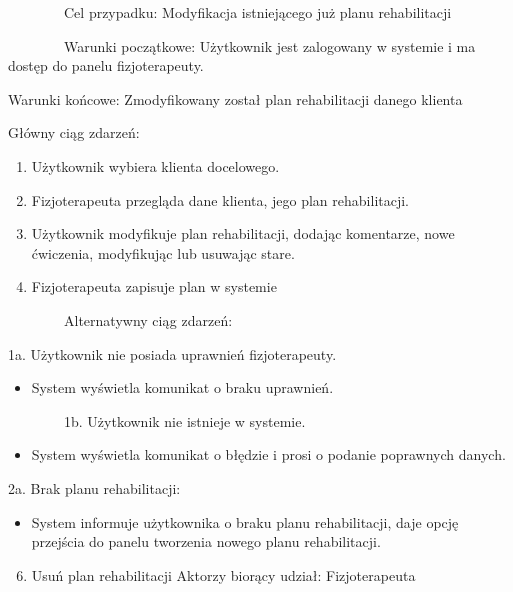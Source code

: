 \documentclass[
]{article}
\providecommand{\tightlist}{%
  \setlength{\itemsep}{0pt}\setlength{\parskip}{0pt}}
\begin{document}
{~~~~~~~~Cel przypadku: Modyfikacja istniejącego już planu
rehabilitacji}

{~~~~~~~~Warunki początkowe: Użytkownik jest zalogowany w systemie i ma
dostęp do panelu fizjoterapeuty.}

{Warunki końcowe: Zmodyfikowany został plan rehabilitacji danego
klienta}

{Główny ciąg zdarzeń:}

\begin{enumerate}
\tightlist
\item
  {Użytkownik wybiera klienta docelowego.}
\item
  {Fizjoterapeuta przegląda dane klienta, jego plan rehabilitacji.}
\item
  {Użytkownik modyfikuje plan rehabilitacji, dodając komentarze, nowe
  ćwiczenia, modyfikując lub usuwając stare.}
\item
  {Fizjoterapeuta zapisuje plan w systemie}
\end{enumerate}

{~~~~~~~~Alternatywny ciąg zdarzeń:}

{1a. Użytkownik nie posiada uprawnień fizjoterapeuty.}

\begin{itemize}
\tightlist
\item
  {System wyświetla komunikat o braku uprawnień.}
\end{itemize}

{~~~~~~~~1b. Użytkownik nie istnieje w systemie.}

\begin{itemize}
\tightlist
\item
  {System wyświetla komunikat o błędzie i prosi o podanie poprawnych
  danych.}
\end{itemize}

{2a. Brak planu rehabilitacji:}

\begin{itemize}
\tightlist
\item
  {System informuje użytkownika o braku planu rehabilitacji, daje opcję
  przejścia do panelu tworzenia nowego planu rehabilitacji.}
\end{itemize}

{}

{}

{}

{}

\begin{enumerate}
\setcounter{enumi}{5}
\tightlist
\item
  {Usuń plan rehabilitacji}{\hfill\break
  Aktorzy biorący udział: Fizjoterapeuta}
\end{enumerate}
\end{document}
